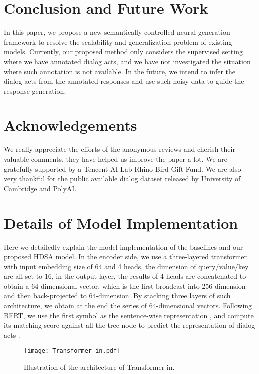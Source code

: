 \documentclass[11pt,a4paper]{article}
\begin{document}
\section{Conclusion and Future Work}
In this paper, we propose a new semantically-controlled neural generation framework to resolve the scalability and generalization problem of existing models. Currently, our proposed method only considers the supervised setting where we have annotated dialog acts, and we have not investigated the situation where such annotation is not available. In the future, we intend to infer the dialog acts from the annotated responses and use such noisy data to guide the response generation. 


\section{Acknowledgements}
We really appreciate the efforts of the anonymous reviews and cherish their valuable comments, they have helped us improve the paper a lot. We are gratefully supported by a Tencent AI Lab Rhino-Bird Gift Fund. We are also very thankful for the public available dialog dataset released by University of Cambridge and PolyAI.





\clearpage
\appendix
\section{Details of Model Implementation}
Here we detailedly explain the model implementation of the baselines and our proposed HDSA model. In the encoder side, we use a three-layered transformer with input embedding size of 64 and 4 heads, the dimension of query/value/key are all set to 16, in the output layer, the results of 4 heads are concatenated to obtain a 64-dimensional vector, which is the first broadcast into 256-dimension and then back-projected to 64-dimension. By stacking three layers of such architecture, we obtain at the end the series of 64-dimensional vectors. Following BERT, we use the first symbol as the sentence-wise representation , and compute its matching score against all the tree node to predict the representation of dialog acts . 
\begin{figure}[thb]
    \begin{center}
    \texttt{[image: Transformer-in.pdf]}
    \end{center}
    \caption{Illustration of the architecture of Transformer-in. }
    \label{fig:transformer-in}
\end{figure}
\end{document}
